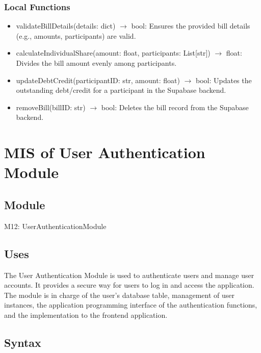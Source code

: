 \documentclass[12pt, titlepage]{article}
\begin{document}
\subsubsection{Local Functions}

\begin{itemize}
  \item validateBillDetails(details: dict) $\rightarrow$ bool: Ensures the provided bill details (e.g., amounts, participants) are valid.
  \item calculateIndividualShare(amount: float, participants: List[str]) $\rightarrow$ float: Divides the bill amount evenly among participants.
  \item updateDebtCredit(participantID: str, amount: float) $\rightarrow$ bool: Updates the outstanding debt/credit for a participant in the Supabase backend.
  \item removeBill(billID: str) $\rightarrow$ bool: Deletes the bill record from the Supabase backend.
\end{itemize}

\newpage


\section{MIS of User Authentication Module} \label{Module} 

\subsection{Module}

M12: UserAuthenticationModule

\subsection{Uses}

The User Authentication Module is used to authenticate users and manage user accounts. It provides a secure way for users to log in and access the application. The module is in charge of the user's database table, management of user instances, the application programming interface of the authentication functions, and the implementation to the frontend application.

\subsection{Syntax}
\end{document}
